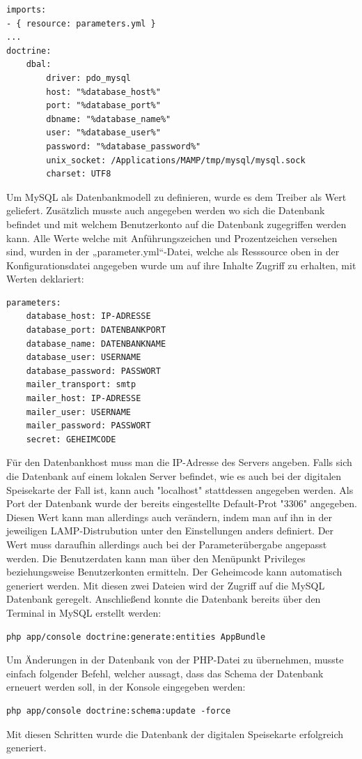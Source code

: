 	\lstset{language=php}
  	\begin{lstlisting}
imports:
- { resource: parameters.yml }
...
doctrine:
	dbal:
		driver: pdo_mysql
		host: "%database_host%"
		port: "%database_port%"
		dbname: "%database_name%"
		user: "%database_user%"
		password: "%database_password%"
		unix_socket: /Applications/MAMP/tmp/mysql/mysql.sock
		charset: UTF8
  	\end{lstlisting}
Um MySQL als Datenbankmodell zu definieren, wurde es dem Treiber als Wert geliefert. Zusätzlich musste auch angegeben werden wo sich die Datenbank befindet und mit welchem Benutzerkonto auf die Datenbank zugegriffen werden kann.
Alle Werte welche mit Anführungszeichen und Prozentzeichen versehen sind, wurden in der „parameter.yml“-Datei, welche als Resssource oben in der Konfigurationsdatei angegeben wurde um auf ihre Inhalte Zugriff zu erhalten, mit Werten deklariert:
	\lstset{language=php}
  	\begin{lstlisting}
parameters:
    database_host: IP-ADRESSE
    database_port: DATENBANKPORT
    database_name: DATENBANKNAME
    database_user: USERNAME
    database_password: PASSWORT
    mailer_transport: smtp
    mailer_host: IP-ADRESSE
    mailer_user: USERNAME
    mailer_password: PASSWORT
    secret: GEHEIMCODE
  	\end{lstlisting}
Für den Datenbankhost muss man die IP-Adresse des Servers angeben. Falls sich die Datenbank auf einem lokalen Server befindet, wie es auch bei der digitalen Speisekarte der Fall ist, kann auch "localhost" stattdessen angegeben werden. Als Port der Datenbank wurde der bereits eingestellte Default-Prot "3306" angegeben. Diesen Wert kann man allerdings auch verändern, indem man auf ihn in der jeweiligen LAMP-Distrubution unter den Einstellungen anders definiert. Der Wert muss daraufhin allerdings auch bei der Parameterübergabe angepasst werden. Die Benutzerdaten kann man über den Menüpunkt Privileges beziehungsweise Benutzerkonten ermitteln. Der Geheimcode kann automatisch generiert werden.
Mit diesen zwei Dateien wird der Zugriff auf die MySQL Datenbank geregelt.
Anschließend konnte die Datenbank bereits über den Terminal in MySQL erstellt werden:
	\lstset{language = bash}
  	\begin{lstlisting}
php app/console doctrine:generate:entities AppBundle
  	\end{lstlisting}
Um Änderungen in der Datenbank von der PHP-Datei zu übernehmen, musste einfach folgender Befehl, welcher aussagt, dass das Schema der Datenbank erneuert werden soll, in der Konsole eingegeben werden:
	\lstset{language=php}
  	\begin{lstlisting}
php app/console doctrine:schema:update -force
  	\end{lstlisting}
Mit diesen Schritten wurde die Datenbank der digitalen Speisekarte erfolgreich generiert.

